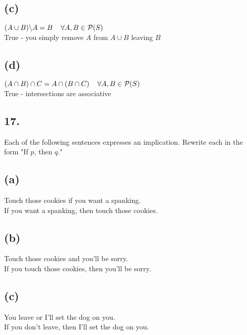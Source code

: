 \documentclass[11pt]{article}
\begin{document}
\subsection*{(c)}
\begin{center}
$(A \cup B) \backslash A = B \hspace{4mm} \forall A,B \in \mathcal{P}(S)$\\
\hfill \break
True - you simply remove $A$ from $A \cup B$ leaving $B$
\end{center}

\subsection*{(d)}
\begin{center}
$(A \cap B) \cap C = A \cap (B \cap C) \hspace{4mm} \forall A,B \in \mathcal{P}(S)$\\
\hfill \break
True - intersections are associative
\end{center}
%
%
\subsection*{17.}
\begin{center}
Each of the following sentences expresses an implication. Rewrite each in the form "If $p$, then $q$."
\end{center}

\subsection*{(a)}
\begin{center}
Touch those cookies if you want a spanking.\\
\hfill \break
If you want a spanking, then touch those cookies.
\end{center}

\subsection*{(b)}
\begin{center}
Touch those cookies and you'll be sorry.\\
\hfill \break
If you touch those cookies, then you'll be sorry.
\end{center}

\subsection*{(c)}
\begin{center}
You leave or I'll set the dog on you.\\
\hfill \break
If you don't leave, then I'll set the dog on you.
\end{center}
\end{document}
